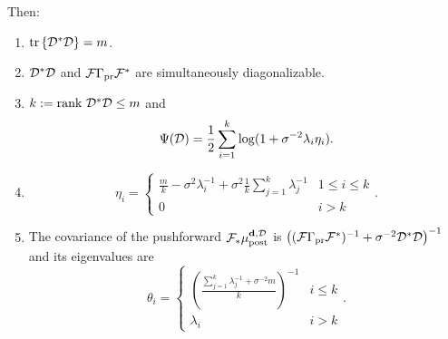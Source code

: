 \begin{theorem}
  Then:
  \begin{enumerate}
  \item  \(\textup{tr}\left \{\mathcal{D}^*\mathcal{D} \right \} = m\).
  \item \(\mathcal{D}^*\mathcal{D}\) and \(\mathcal{F}\Gamma_{\textup{pr}}\mathcal{F}^*\) are simultaneously
    diagonalizable.
  \item \(k := \textup{rank}\  \mathcal{D}^*\mathcal{D} \leq m\) and
    \begin{equation*}
      \tar(\opt) = \frac12 \sum_{i=1}^{k} \log (1 + \sigma^{-2}\lambda_i\eta_i). %
    \end{equation*}
  \item
    \begin{equation*}
        \eta_i = \begin{cases}
          \frac{m}{k} - \sigma^2 \lambda_i^{-1} + \sigma^2 \frac{1}{k} \sum_{j=1}^k \lambda_j^{-1} & 1 \leq i \leq k \\
          0 & i > k 
        \end{cases}.
    \end{equation*}
  \item The covariance of the pushforward \(\mathcal{F}_{*} \mu_{\textup{post}}^{\mathbf{d}, \mathcal{D}}\) is \(\left
    ( (\mathcal{F} \Gamma_{\textup{pr}} \mathcal{F}^*)^{-1} + \sigma^{-2} \mathcal{D}^*\mathcal{D} \right
    )^{-1}\) and its eigenvalues are
    \begin{equation}\label{eq:cylinders}
      \theta_i =
      \begin{cases}
        \left(\frac{\sum_{j=1}^k \lambda_j^{-1} + \sigma^{-2}m}{k} \right )^{-1} & i \leq k \\
        \lambda_i &  i > k 
      \end{cases}.
    \end{equation}
  \end{enumerate}
\end{theorem}

